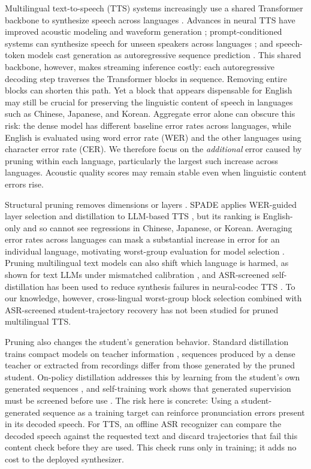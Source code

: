 \documentclass{article}
\begin{document}
Multilingual text-to-speech (TTS) systems increasingly use a shared
Transformer backbone to synthesize speech across languages
\cite{du2024cosyvoice,du2025cosyvoice3}. Advances in neural TTS have
improved acoustic modeling and waveform generation
\cite{shen2018naturaltts}; prompt-conditioned systems can synthesize
speech for unseen speakers across languages
\cite{casanova2022yourtts,le2023voicebox}; and speech-token models
cast generation as autoregressive sequence prediction
\cite{wang2023neuralcodec,kharitonov2023speak}. This shared backbone,
however, makes streaming inference costly: each autoregressive
decoding step traverses the Transformer blocks in sequence.
Removing entire blocks can shorten this path. Yet a block that
appears dispensable for English may still be crucial for preserving
the linguistic content of speech in languages such as Chinese,
Japanese, and Korean. Aggregate error alone can obscure this risk:
the dense model has different baseline error rates across languages,
while English is evaluated using word error rate (WER) and the other
languages using character error rate (CER). We therefore focus on the
\emph{additional} error caused by pruning within each language,
particularly the largest such increase across languages. Acoustic
quality scores may remain stable even when linguistic content errors
rise.

Structural pruning removes dimensions or layers
\cite{ma2023llmpruner,ashkboos2024slicegpt,men2025shortgpt}. SPADE applies
WER-guided layer selection and distillation to LLM-based TTS
\cite{nguyen2026spade}, but its ranking is English-only and so cannot see
regressions in Chinese, Japanese, or Korean. Averaging error rates across languages can mask a substantial increase in error for an individual
language, motivating worst-group evaluation for model selection \cite{sagawa2020dro}. Pruning multilingual text models can also
shift which language is harmed, as shown for text LLMs under mismatched
calibration \cite{kurz2026limitations}, and ASR-screened self-distillation
has been used to reduce synthesis failures in neural-codec TTS
\cite{asaria2026reliable}. To our knowledge, however, cross-lingual
worst-group block selection combined with ASR-screened student-trajectory
recovery has not been studied for pruned multilingual TTS.

Pruning also changes the student's generation behavior. Standard distillation
trains compact models on teacher information
\cite{hinton2015distilling,kim2016sequence}, sequences produced by a dense teacher or extracted from recordings differ from those generated by the pruned student. On-policy distillation addresses this by learning
from the student's own generated sequences
\cite{agarwal2024onpolicy}, and self-training work shows that generated
supervision must be screened before use \cite{park2020improved}. The risk
here is concrete: Using a student-generated sequence as a training target can reinforce pronunciation errors present in
its decoded speech. For TTS, an offline ASR recognizer can compare the
decoded speech against the requested text and discard trajectories that
fail this content check before they are used. This check runs only in
training; it adds no cost to the deployed synthesizer.
\end{document}
